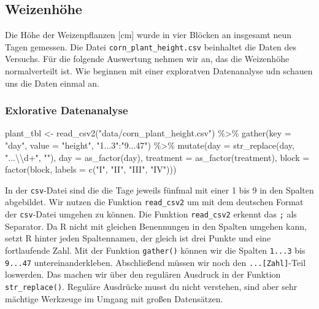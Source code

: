 \documentclass[
  letterpaper,
  DIV=11,
  oneside]{scrreport}
\newenvironment{Shaded}{\begin{snugshade}}{\end{snugshade}}
\newcommand{\AttributeTok}[1]{\textcolor[rgb]{0.40,0.45,0.13}{#1}}
\newcommand{\FunctionTok}[1]{\textcolor[rgb]{0.28,0.35,0.67}{#1}}
\newcommand{\NormalTok}[1]{\textcolor[rgb]{0.00,0.23,0.31}{#1}}
\newcommand{\OtherTok}[1]{\textcolor[rgb]{0.00,0.23,0.31}{#1}}
\newcommand{\SpecialCharTok}[1]{\textcolor[rgb]{0.37,0.37,0.37}{#1}}
\newcommand{\StringTok}[1]{\textcolor[rgb]{0.13,0.47,0.30}{#1}}
\begin{document}
\hypertarget{weizenhuxf6he}{%
\subsection{Weizenhöhe}\label{weizenhuxf6he}}

Die Höhe der Weizenpflanzen {[}cm{]} wurde in vier Blöcken an insgesamt
neun Tagen gemessen. Die Datei \texttt{corn\_plant\_height.csv}
beinhaltet die Daten des Versuchs. Für die folgende Auswertung nehmen
wir an, das die Weizenhöhe normalverteilt ist. Wie beginnen mit einer
exploratven Datenanalyse udn schauen uns die Daten einmal an.

\hypertarget{exlorative-datenanalyse}{%
\subsubsection{Exlorative Datenanalyse}\label{exlorative-datenanalyse}}

\begin{Shaded}
\begin{Highlighting}[]
\NormalTok{plant\_tbl }\OtherTok{\textless{}{-}} \FunctionTok{read\_csv2}\NormalTok{(}\StringTok{"data/corn\_plant\_height.csv"}\NormalTok{) }\SpecialCharTok{\%\textgreater{}\%} 
  \FunctionTok{gather}\NormalTok{(}\AttributeTok{key =} \StringTok{"day"}\NormalTok{, }\AttributeTok{value =} \StringTok{"height"}\NormalTok{, }\StringTok{"1...3"}\SpecialCharTok{:}\StringTok{"9...47"}\NormalTok{) }\SpecialCharTok{\%\textgreater{}\%} 
  \FunctionTok{mutate}\NormalTok{(}\AttributeTok{day =} \FunctionTok{str\_replace}\NormalTok{(day, }\StringTok{"...}\SpecialCharTok{\textbackslash{}\textbackslash{}}\StringTok{d+"}\NormalTok{, }\StringTok{""}\NormalTok{),}
         \AttributeTok{day =} \FunctionTok{as\_factor}\NormalTok{(day),}
         \AttributeTok{treatment =} \FunctionTok{as\_factor}\NormalTok{(treatment),}
         \AttributeTok{block =} \FunctionTok{factor}\NormalTok{(block, }\AttributeTok{labels =} \FunctionTok{c}\NormalTok{(}\StringTok{"I"}\NormalTok{, }\StringTok{"II"}\NormalTok{, }\StringTok{"III"}\NormalTok{, }\StringTok{"IV"}\NormalTok{)))}
\end{Highlighting}
\end{Shaded}

In der \texttt{csv}-Datei sind die die Tage jeweils fünfmal mit einer 1
bis 9 in den Spalten abgebildet. Wir nutzen die Funktion
\texttt{read\_csv2} um mit dem deutschen Format der \texttt{csv}-Datei
umgehen zu können. Die Funktion \texttt{read\_csv2} erkennt das
\texttt{;} als Separator. Da R nicht mit gleichen Benennungen in den
Spalten umgehen kann, setzt R hinter jeden Spaltennamen, der gleich ist
drei Punkte und eine fortlaufende Zahl. Mit der Funktion
\texttt{gather()} können wir die Spalten \texttt{1...3} bis
\texttt{9...47} untereinanderkleben. Abschließend müssen wir noch den
\texttt{...{[}Zahl{]}}-Teil loswerden. Das machen wir über den regulären
Ausdruck in der Funktion \texttt{str\_replace()}. Reguläre Ausdrücke
musst du nicht verstehen, sind aber sehr mächtige Werkzeuge im Umgang
mit großen Datensätzen.
\end{document}
